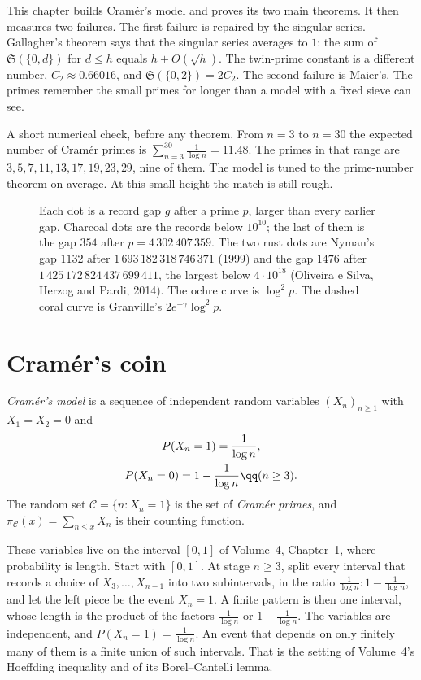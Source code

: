 This chapter builds Cramér's model and proves its two main theorems. It then measures two failures. The first failure is repaired by the singular series. Gallagher's theorem says that the singular series averages to $1$: the sum of $\mathfrak S(\{0,d\})$ for $d\le h$ equals $h+O(\sqrt h)$. The twin-prime constant is a different number, $C_2\approx0.66016$, and $\mathfrak S(\{0,2\})=2C_2$. The second failure is Maier's. The primes remember the small primes for longer than a model with a fixed sieve can see.

A short numerical check, before any theorem. From $n=3$ to $n=30$ the expected number of Cramér primes is $\sum_{n=3}^{30}\frac1{\log n}=11.48$. The primes in that range are $3,5,7,11,13,17,19,23,29$, nine of them. The model is tuned to the prime-number theorem on average. At this small height the match is still rough.

\begin{figure}[ht]
\centering
{}
\caption{Each dot is a record gap $g$ after a prime $p$, larger than every earlier gap. Charcoal dots are the records below $10^{10}$; the last of them is the gap $354$ after $p=4\,302\,407\,359$. The two rust dots are Nyman's gap $1132$ after $1\,693\,182\,318\,746\,371$ (1999) and the gap $1476$ after $1\,425\,172\,824\,437\,699\,411$, the largest below $4\cdot10^{18}$ (Oliveira e Silva, Herzog and Pardi, 2014). The ochre curve is $\log^2 p$. The dashed coral curve is Granville's $2e^{-\gamma}\log^2 p$.}
\label{fig:gaps}
\end{figure}

\section{Cramér's coin}

\begin{definition}\label{def:cramer}
\emph{Cramér's model} is a sequence of independent random variables $(X_n)_{n\ge1}$ with $X_1=X_2=0$ and
\[
\begin{gathered}P(X_n=1)=\frac1{\log n},\\P(X_n=0)=1-\frac1{\log n}\qq(n\ge3).\end{gathered}
\]
The random set $\mathcal C=\{n:X_n=1\}$ is the set of \emph{Cramér primes}, and $\pi_{\mathcal C}(x)=\sum_{n\le x}X_n$ is their counting function.
\end{definition}

These variables live on the interval $[0,1]$ of Volume~4, Chapter~1, where probability is length. Start with $[0,1]$. At stage $n\ge3$, split every interval that records a choice of $X_3,\dots,X_{n-1}$ into two subintervals, in the ratio $\frac1{\log n}:1-\frac1{\log n}$, and let the left piece be the event $X_n=1$. A finite pattern is then one interval, whose length is the product of the factors $\frac1{\log n}$ or $1-\frac1{\log n}$. The variables are independent, and $P(X_n=1)=\frac1{\log n}$. An event that depends on only finitely many of them is a finite union of such intervals. That is the setting of Volume~4's Hoeffding inequality and of its Borel--Cantelli lemma.

